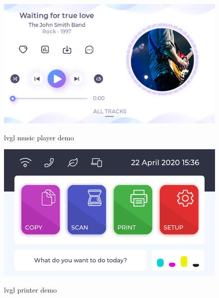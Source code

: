 \documentclass[Bachelor, BIC, english, fhCitStyle, IEEE]{BASE/twbook} %
\begin{document}
\begin{figure}[H]
    \caption{\ac{lvgl} music player demo \autocite{llcLiveDemosTest}}
    \centering
    \includegraphics[height=0.3\textheight]{lvgl-musicplayer-demo.png}
    \label{fig:lvgl-musicplayer-demo}
\end{figure}
\begin{figure}[H]
    \caption{\ac{lvgl} printer demo \autocite{llcLiveDemosTest}}
    \centering
    \includegraphics[height=0.3\textheight]{lvgl-printer-demo.png}
    \label{fig:lvgl-printer-demo}
\end{figure}
\clearpage
\end{document}
